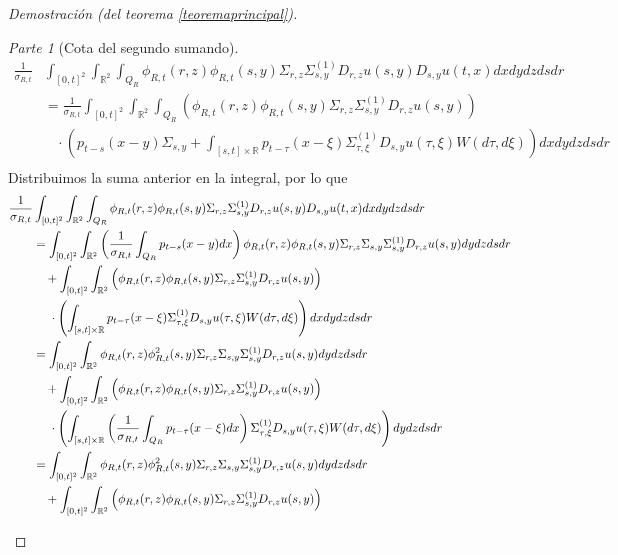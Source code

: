 \documentclass[letterpaper,twoside,12pt]{book}
\newcommand{\R}{\mathbb{R}}
\newcommand{\1}{\mathds{1}}
\theoremstyle{definition}
\theoremstyle{definition}
\theoremstyle{remark}
\newtheorem{proofpart}{Parte}
\theoremstyle{definition}
\theoremstyle{definition}
\theoremstyle{definition}
\theoremstyle{definition}
\theoremstyle{definition}
\begin{document}
\begin{proof}[Demostración (del teorema \ref{teoremaprincipal})]
\begin{proofpart}[Cota del segundo sumando]
   \begin{align*}
      \frac{1}{\sigma_{R,t}}&\int_{[0,t]^2}\int_{\R^2}\int_{Q_R}\phi_{R,t}(r,z)\phi_{R,t}(s,y)\Sigma_{r,z}\Sigma^{(1)}_{s,y}D_{r,z}u(s,y)D_{s,y}u(t,x)dx dy dz ds dr\\
      &=\frac{1}{\sigma_{R,t}}\int_{[0,t]^2}\int_{\R^2}\int_{Q_R}\left(\phi_{R,t}(r,z)\phi_{R,t}(s,y)\Sigma_{r,z}\Sigma^{(1)}_{s,y}D_{r,z}u(s,y)\right)\\
      & \ \ \ \ \cdot\left(p_{t-s}(x-y)\Sigma_{s,y}+ \int_{[s,t]\times\R} p_{t-\tau}(x-\xi)\Sigma^{(1)}_{\tau,\xi}D_{s,y}u(\tau,\xi)W(d\tau,d\xi)\right)dx dy dz ds dr\\
   \end{align*}
   Distribuimos la suma anterior en la integral, por lo que 
   \begin{align}
      \frac{1}{\sigma_{R,t}}&\int_{[0,t]^2}\int_{\R^2}\int_{Q_R}\phi_{R,t}(r,z)\phi_{R,t}(s,y)\Sigma_{r,z}\Sigma^{(1)}_{s,y}D_{r,z}u(s,y)D_{s,y}u(t,x)dx dy dz ds dr\notag\\
      &=\int_{[0,t]^2}\int_{\R^2}\left(\frac{1}{\sigma_{R,t}}\int_{Q_R}p_{t-s}(x-y)dx\right)\phi_{R,t}(r,z)\phi_{R,t}(s,y)\Sigma_{r,z}\Sigma_{s,y}\Sigma^{(1)}_{s,y}D_{r,z}u(s,y)dy dz ds dr\notag\\
      & \ \ \ + \int_{[0,t]^2}\int_{\R^2}\left(\phi_{R,t}(r,z)\phi_{R,t}(s,y)\Sigma_{r,z}\Sigma^{(1)}_{s,y}D_{r,z}u(s,y)\right)\notag\\
      &\ \ \ \ \cdot\left(\int_{[s,t]\times\R} p_{t-\tau}(x-\xi)\Sigma^{(1)}_{\tau,\xi}D_{s,y}u(\tau,\xi)W(d\tau,d\xi)\right)dx dy dz ds dr\notag\\
      &=\int_{[0,t]^2}\int_{\R^2}\phi_{R,t}(r,z)\phi_{R,t}^2(s,y)\Sigma_{r,z}\Sigma_{s,y}\Sigma^{(1)}_{s,y}D_{r,z}u(s,y)dy dz ds dr\notag\\
      & \ \ \ + \int_{[0,t]^2}\int_{\R^2}\left(\phi_{R,t}(r,z)\phi_{R,t}(s,y)\Sigma_{r,z}\Sigma^{(1)}_{s,y}D_{r,z}u(s,y)\right)\notag\\
      &\ \ \ \ \cdot\left(\int_{[s,t]\times\R} \left(\frac{1}{\sigma_{R,t}}\int_{Q_R}p_{t-\tau}(x-\xi)dx\right)\Sigma^{(1)}_{\tau,\xi}D_{s,y}u(\tau,\xi)W(d\tau,d\xi)\right)dy dz ds dr\notag\\
      &=\int_{[0,t]^2}\int_{\R^2}\phi_{R,t}(r,z)\phi_{R,t}^2(s,y)\Sigma_{r,z}\Sigma_{s,y}\Sigma^{(1)}_{s,y}D_{r,z}u(s,y)dy dz ds dr\label{pruebasumando3}\\
      &\ \ \ + \int_{[0,t]^2}\int_{\R^2}\left(\phi_{R,t}(r,z)\phi_{R,t}(s,y)\Sigma_{r,z}\Sigma^{(1)}_{s,y}D_{r,z}u(s,y)\right)\notag\\

\end{align}
\end{proofpart}
\end{proof}
\end{document}
